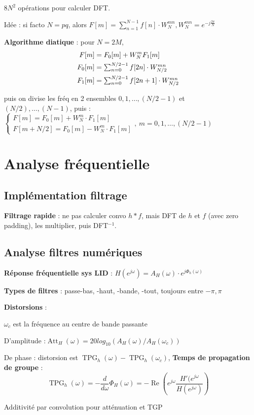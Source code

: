$8N^2$ opérations pour calculer DFT.

Idée : si facto $N=pq$, alors $F[m] = \sum_{n=1}^{N-1} f[n] \cdot W_N^{mn}, W_N^{mn} = e^{-j\frac{2\pi}{N}}$

\textbf{Algorithme diatique} : pour $N=2M$, 
\begin{align*}
    F[m] &= F_0[m] + W_N^m F_1[m]\\
    F_0[m] &= \textstyle\sum_{n=0}^{N/2-1} f[2n]\cdot W_{N/2}^{mn}  \\
    F_1[m] &= \textstyle\sum_{n=0}^{N/2-1}f[2n+1] \cdot W_{N/2}^{mn}
\end{align*}

puis on divise les fréq en 2 ensembles $0,1,\dots,(N/2-1)$ et $(N/2),\dots,(N-1)$, puis : $\begin{cases}F[m] = F_0[m] + W_N^m\cdot F_1[m]\\F[m+N/2]=F_0[m]-W_N^m\cdot F_1[m]\end{cases}, \: m=0,1,\dots,(N/2-1)$


\section{Analyse fréquentielle }

\subsection*{Implémentation filtrage}

\textbf{Filtrage rapide} : ne pas calculer convo $h*f$, mais DFT de $h$ et $f$ (avec zero padding), les multiplier, puis DFT$^{-1}$. 

\subsection*{Analyse filtres numériques}

\textbf{Réponse fréquentielle sys LID} : $H(e^{j\omega}) = A_H(\omega) \cdot e^{j\Phi_h(\omega)}$

\textbf{Types de filtres} : passe-bas, -haut, -bande, -tout, toujours entre $-\pi,\pi$

\textbf{Distorsions} : 
\begin{myitemize}
    \item $\omega_c$ est la fréquence au centre de bande passante
    \item D'amplitude :$\operatorname{Att}_H(\omega) = 20log_10(A_H(\omega)/A_H(\omega_c))$
    \item De phase : distorsion est $\operatorname{TPG}_h(\omega)-\operatorname{TPG}_h(\omega_c)$, \textbf{Temps de propagation de groupe} :
    \begin{equation*}
        \operatorname{TPG}_h(\omega) = -\frac{d}{d\omega} \Phi_H(\omega) = - \operatorname{Re}\left( e^{j\omega} \frac{H'(e^{j\omega}}{H(e^{j\omega})} \right)
    \end{equation*}
    \item Additivité par convolution pour atténuation et TGP
\end{myitemize}

